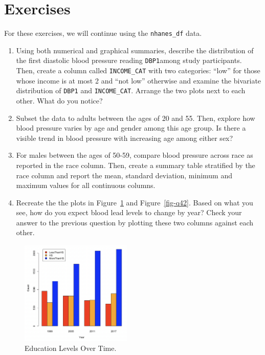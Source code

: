\documentclass[
  letterpaper,
]{krantz}
\begin{document}
\hypertarget{exercises-2}{%
\section{Exercises}\label{exercises-2}}

For these exercises, we will continue using the \texttt{nhanes\_df}
data.

\begin{enumerate}
\def\labelenumi{\arabic{enumi}.}
\item
  Using both numerical and graphical summaries, describe the
  distribution of the first diastolic blood pressure reading
  \texttt{DBP1}among study participants. Then, create a column called
  \texttt{INCOME\_CAT} with two categories: ``low'' for those whose
  income is at most 2 and ``not low'' otherwise and examine the
  bivariate distribution of \texttt{DBP1} and \texttt{INCOME\_CAT}.
  Arrange the two plots next to each other. What do you notice?
\item
  Subset the data to adults between the ages of 20 and 55. Then, explore
  how blood pressure varies by age and gender among this age group. Is
  there a visible trend in blood pressure with increasing age among
  either sex?
\item
  For males between the ages of 50-59, compare blood pressure across
  race as reported in the race column. Then, create a summary table
  stratified by the race column and report the mean, standard deviation,
  minimum and maximum values for all continuous columns.
\item
  Recreate the the plots in Figure~\ref{fig-q41} and
  Figure~\ref{fig-q42}. Based on what you see, how do you expect blood
  lead levels to change by year? Check your answer to the previous
  question by plotting these two columns against each other.
\end{enumerate}

\begin{figure}

{\centering \includegraphics[width=2.08333in,height=\textheight]{book/images/4-exercise4plot1.png}

}

\caption{\label{fig-q41}Education Levels Over Time.}

\end{figure}
\end{document}
